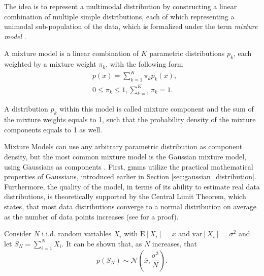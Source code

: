 \documentclass[../../../main.tex]{subfiles}
\begin{document}
The idea is to represent a multimodal distribution by constructing a linear combination of multiple simple distributions, each of which representing a unimodal sub-population of the data, which is formalized under the term \textit{mixture model} \cite[p.111]{bis_2006}.

\begin{definition} \cite[p. 315]{dei_2020}
A mixture model is a linear combination of $K$ parametric distributions $p_k$, each weighted by a mixture weight $\pi_k$, with the following form 
\begin{align*}
    &p(x) = \sum\limits_{k=1}^K \pi_k p_k (x), \\
    &0 \leq \pi_k \leq 1, \sum\limits_{k=1}^K \pi_k = 1.
\end{align*}
\end{definition}

A distribution $p_k$ within this model is called mixture component and the sum of the mixture weights equals to 1, such that the probability density of the mixture components equals to 1 as well. 

Mixture Models can use any arbitrary parametric distribution as component density, but the most common mixture model is the Gaussian mixture model, using Gaussians as components \cite[214]{has_2009}. First, \acrshort{gmm}s utilize the practical mathematical properties of Gaussians, introduced earlier in Section \ref{sec:gaussian_distribution}. Furthermore, the quality of the model, in terms of its ability to estimate real data distributions, is theoretically supported by the Central Limit Theorem, which states, that most data distributions converge to a normal distribution on average as the number of data points increases (see \cite[p.222]{jay_2003} for a proof).

\begin{theorem}\label{th:central_limit} \cite[p.241]{montgomery_2010}
Consider $N$ i.i.d. random variables $X_i$ with $\mathrm{E}[X_i]=\overline{x}$ and $\mathrm{var}[X_i]=\sigma^2$ and let $S_N=\sum^N_{i=1}X_i$. It can be shown that, as $N$ increases, that
\begin{equation*}
    p(S_N) \sim \mathcal{N}\left(\overline{x}, \frac{\sigma^2}{N}\right).
\end{equation*}
\end{theorem}
\end{document}
